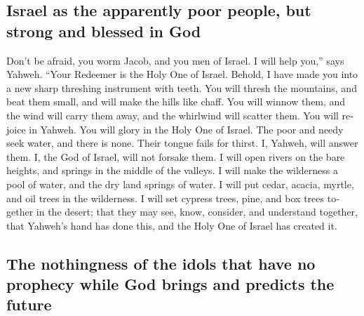 \begin{paracol}{2}
\begin{otherlanguage}{english}
\hypertarget{israel-as-the-apparently-poor-people-but-strong-and-blessed-in-god}{%
\subsection{Israel as the apparently poor people, but strong and blessed
in
God}\label{israel-as-the-apparently-poor-people-but-strong-and-blessed-in-god}}

 Don't be afraid, you worm Jacob, and you men of Israel.
I will help you,'' says Yahweh. ``Your Redeemer is the Holy One of
Israel.  Behold, I have made you into a new sharp
threshing instrument with teeth. You will thresh the mountains, and beat
them small, and will make the hills like chaff.  You will
winnow them, and the wind will carry them away, and the whirlwind will
scatter them. You will rejoice in Yahweh. You will glory in the Holy One
of Israel.  The poor and needy seek water, and there is
none. Their tongue fails for thirst. I, Yahweh, will answer them. I, the
God of Israel, will not forsake them.  I will open rivers
on the bare heights, and springs in the middle of the valleys. I will
make the wilderness a pool of water, and the dry land springs of water.
 I will put cedar, acacia, myrtle, and oil trees in the
wilderness. I will set cypress trees, pine, and box trees together in
the desert;  that they may see, know, consider, and
understand together, that Yahweh's hand has done this, and the Holy One
of Israel has created it.

\hypertarget{the-nothingness-of-the-idols-that-have-no-prophecy-while-god-brings-and-predicts-the-future}{%
\subsection{The nothingness of the idols that have no prophecy while God
brings and predicts the
future}\label{the-nothingness-of-the-idols-that-have-no-prophecy-while-god-brings-and-predicts-the-future}}


\end{otherlanguage}
\end{paracol}
